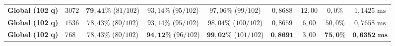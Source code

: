 \begin{table}[htbp]
\begin{adjustbox}{max width=\linewidth}
\begin{tabular}{llccccccc}
\midrule
\textbf{Global (102 q)}   & $3072$ & $\mathbf{79,41\%}$ ($81/102$) & $93,14\%$ ($95/102$) & $97,06\%$ ($99/102$) & $0,8688$ & $12,00$ & $0,0\%$ & $1,1425\text{ ms}$ \\
\textbf{Global (102 q)}   & $1536$ & $78,43\%$ ($80/102$) & $93,14\%$ ($95/102$) & $98,04\%$ ($100/102$) & $0,8659$ & $6,00$ & $50,0\%$ & $0,7658\text{ ms}$ \\
\textbf{Global (102 q)}   & $768$  & $78,43\%$ ($80/102$) & $\mathbf{94,12\%}$ ($96/102$) & $\mathbf{99,02\%}$ ($101/102$) & $\mathbf{0,8691}$ & $3,00$ & $\mathbf{75,0\%}$ & $\mathbf{0,6352\text{ ms}}$ \\
\bottomrule
\end{tabular}
\end{adjustbox}
\end{table}

